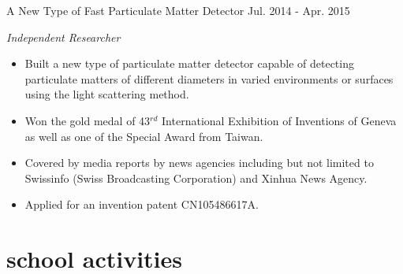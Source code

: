 \documentclass[hidelinks__VERSION__]{adamyi-cv} %
\begin{document}
\begin{entrylist}

\entry
{A New Type of Fast Particulate Matter Detector}
{Jul. 2014 - Apr. 2015}
{\emph{Independent Researcher}
\begin{itemize}
\item Built a new type of particulate matter detector capable of detecting particulate matters of different diameters in varied environments or surfaces using the light scattering method.
\item Won the gold medal of 43$^{rd}$ International Exhibition of Inventions of Geneva as well as one of the Special Award from Taiwan.
\item Covered by media reports by news agencies including but not limited to Swissinfo (Swiss Broadcasting Corporation) and Xinhua News Agency.
\item Applied for an invention patent CN105486617A.
\end{itemize}}


\end{entrylist}




\section{school activities}
\end{document}
